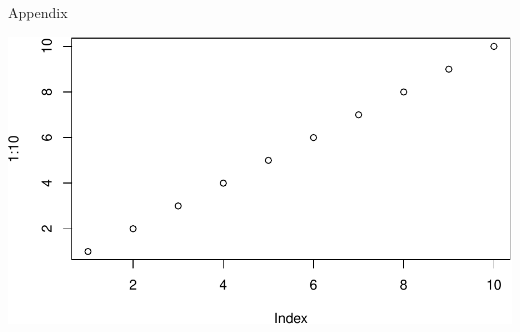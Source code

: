 \clearpage
\makeatletter
\efloat@restorefloats
\makeatother


\begin{appendix}
\section{}
Appendix

\includegraphics{IPIP_draft_files/figure-latex/unnamed-chunk-4-1.pdf}
\end{appendix}
